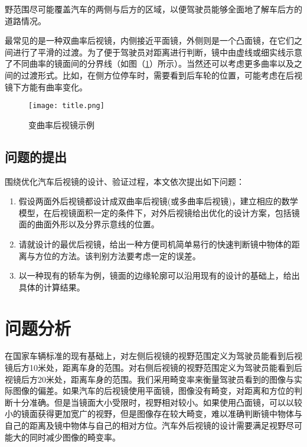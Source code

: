 \documentclass[bwprint]{cumcmthesis}
\begin{document}
\par 野范围尽可能覆盖汽车的两侧与后方的区域，以便驾驶员能够全面地了解车后方的道路情况。

\par 最常见的是一种双曲率后视镜，内侧接近平面镜，外侧则是一个凸面镜，在它们之间进行了平滑的过渡。为了便于驾驶员对距离进行判断，镜中由虚线或细实线示意了不同曲率的镜面间的分界线（如图（\ref{title}）所示）。当然还可以考虑更多曲率以及之间的过渡形式。比如，在侧方位停车时，需要看到后车轮的位置，可能考虑在后视镜下方能有曲率变化。

\begin{figure}[!htb]
\centering
\texttt{[image: title.png]}
\caption{变曲率后视镜示例}
\label{title}
\end{figure}

\subsection{问题的提出}

围绕优化汽车后视镜的设计、验证过程，本文依次提出如下问题：

\begin{enumerate}
  \item 假设两面外后视镜都设计成双曲率后视镜(或多曲率后视镜)，建立相应的数学模型，在后视镜面积一定的条件下，对外后视镜给出优化的设计方案，包括镜面的曲面外形以及分界示意线的位置。
  \item 请就设计的最优后视镜，给出一种方便司机简单易行的快速判断镜中物体的距离与方位的方法。该判别方法要考虑一定的误差。
  \item 以一种现有的轿车为例，镜面的边缘轮廓可以沿用现有的设计的基础上，给出具体的计算结果。 
\end{enumerate}

\section{问题分析}

\par 在国家车辆标准的现有基础上，对左侧后视镜的视野范围定义为驾驶员能看到后视镜后方10米处，距离车身的范围。对右侧后视镜的视野范围定义为驾驶员能看到后视镜后方20米处，距离车身的范围。我们采用畸变率来衡量驾驶员看到的图像与实际图像的偏差。如果汽车的后视镜使用平面镜，图像没有畸变，对距离和方位的判断十分准确。但是当镜面大小受限时，视野相对较小。如果使用凸面镜，可以以较小的镜面获得更加宽广的视野，但是图像存在较大畸变，难以准确判断镜中物体与自己的距离及镜中物体与自己的相对方位。汽车外后视镜的设计需要满足视野尽可能大的同时减少图像的畸变率。
\end{document}
